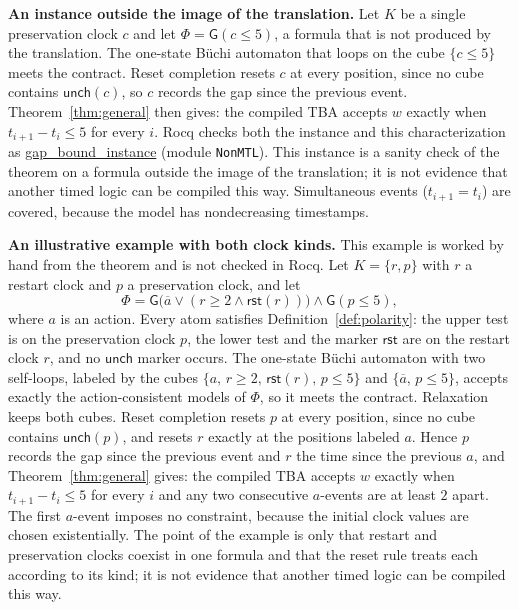 \documentclass[manuscript]{acmart}
\newcommand{\Always}{\mathsf{G}}
\providecommand{\Reset}{}\renewcommand{\Reset}{\mathsf{rst}}
\newcommand{\Unch}{\mathsf{unch}}
\newcommand{\runinhead}[1]{\par\noindent\textbf{#1}\enspace}
\newcommand{\Rocqid}[1]{\url{#1}}
\begin{document}
\runinhead{An instance outside the image of the translation.}
Let $K$ be a single preservation clock $c$ and let
$\Phi=\Always(c\le 5)$, a formula that is not produced by the translation. The
one-state B\"uchi automaton that loops on the cube $\{c\le 5\}$ meets the
contract. Reset completion resets $c$ at every position, since no cube contains
$\Unch(c)$, so $c$ records the gap since the previous event. Theorem~\ref{thm:general}
then gives: the compiled TBA accepts $w$ exactly when
$t_{i+1}-t_i\le 5$ for every $i$. Rocq checks both the instance and this
characterization as \Rocqid{gap_bound_instance} (module \texttt{NonMTL}). This
instance is a sanity check of the theorem on a formula outside the image of the
translation; it is not evidence that another timed logic can be compiled this
way.
Simultaneous events ($t_{i+1}=t_i$) are covered, because the model has
nondecreasing timestamps.

\runinhead{An illustrative example with both clock kinds.}
This example is worked by hand from the theorem and is not checked in Rocq.
Let $K=\{r,p\}$ with $r$ a restart clock and $p$ a preservation clock, and let
\[
\Phi=\Always\bigl(\overline{a}\lor(r\ge 2\land\Reset(r))\bigr)\land\Always(p\le 5),
\]
where $a$ is an action. Every atom satisfies Definition~\ref{def:polarity}: the
upper test is on the preservation clock $p$, the lower test and the marker
$\Reset$ are on the restart clock $r$, and no $\Unch$ marker occurs. The
one-state B\"uchi automaton with two self-loops, labeled by the cubes
$\{a,\,r\ge 2,\,\Reset(r),\,p\le 5\}$ and $\{\overline{a},\,p\le 5\}$,
accepts exactly the action-consistent models of $\Phi$, so it meets the
contract. Relaxation keeps both cubes. Reset completion resets $p$ at every
position, since no cube contains $\Unch(p)$, and resets $r$ exactly at the
positions labeled $a$. Hence $p$ records the gap since the previous event and
$r$ the time since the previous $a$, and Theorem~\ref{thm:general} gives: the
compiled TBA accepts $w$ exactly when $t_{i+1}-t_i\le 5$ for every $i$ and any
two consecutive $a$-events are at least $2$ apart. The first $a$-event imposes
no constraint, because the initial clock values are chosen existentially. The
point of the example is only that restart and preservation clocks coexist in
one formula and that the reset rule treats each according to its kind; it is
not evidence that another timed logic can be compiled this way.
\end{document}
